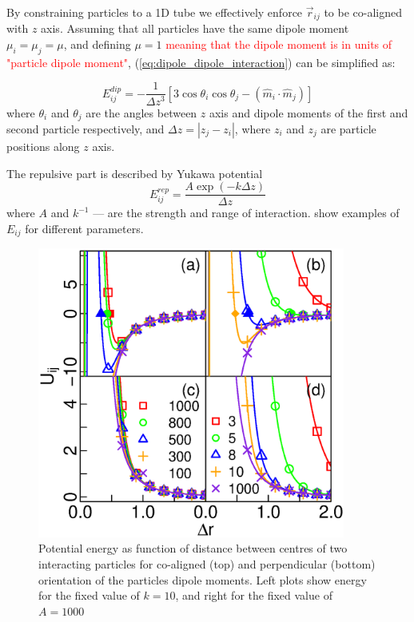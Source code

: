By constraining particles to a 1D tube we effectively enforce $\vec{r}_{ij}$ to be co-aligned with $z$ axis. Assuming that all particles have the same dipole moment $\mu_i = \mu_j = \mu$, and defining $\mu = 1$ \textcolor{red}{meaning that the dipole moment is in units of "particle dipole moment"}, (\ref{eq:dipole_dipole_interaction}) can be simplified as:

\begin{equation}
\label{eq:dipole_dipole_1D}
E_{ij}^{dip} = - \frac{1}{\Delta z^3} [3 \cos \theta_i \cos \theta_j - (\hat{m}_i \cdot \hat{m}_j)]
\end{equation}
where $\theta_i$ and $\theta_j$ are the angles between $z$ axis and dipole moments of the first and second particle respectively, and $\Delta z = |z_j - z_i|$, where $z_i$ and $z_j$ are particle positions along $z$ axis.

The repulsive part is described by Yukawa potential
\begin{equation}
\label{eq:yukawa_interaction}
E_{ij}^{rep} = \frac{A \exp(-k \Delta z)}{\Delta z}
\end{equation}
where $A$ and $k^{-1}$ --- are the strength and range of interaction.  show examples of $E_{ij}$ for different parameters.

\begin{figure}[p]
\centering
	\includegraphics[width=0.9\textwidth]{Images/particle_interaction_potential}
\captionsetup{justification=centering, width=0.9\textwidth}
\caption{Potential energy as function of distance between centres of two interacting particles for co-aligned (top) and perpendicular (bottom) orientation of the particles dipole moments. Left plots show energy for the fixed value of $k = 10$, and right for the fixed value of $A = 1000$}
\label{fig:interaction_energy}
\end{figure}

